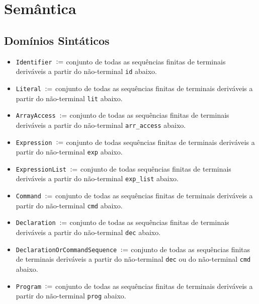 \documentclass[12pt]{article}
\newcommand{\defeq}{\vcentcolon=}
\begin{document}
\section{Semântica}

\subsection{Domínios Sintáticos}

\begin{itemize}
\item {\tt Identifier $\defeq$} conjunto de todas as sequências finitas de terminais deriváveis a partir do não-terminal {\tt id} abaixo.

\item {\tt Literal $\defeq$} conjunto de todas as sequências finitas de terminais deriváveis a partir do não-terminal {\tt lit} abaixo.

\item {\tt ArrayAccess $\defeq$} conjunto de todas as sequências finitas de terminais deriváveis a partir do não-terminal {\tt arr\_access} abaixo.

\item {\tt Expression $\defeq$} conjunto de todas sequências finitas de terminais deriváveis a partir do não-terminal {\tt exp} abaixo.

\item {\tt ExpressionList $\defeq$} conjunto de todas sequências finitas de terminais deriváveis a partir do não-terminal {\tt exp\_list} abaixo.

\item {\tt Command $\defeq$} conjunto de todas as sequências finitas de terminais deriváveis a partir do não-terminal {\tt cmd} abaixo.

\item {\tt Declaration $\defeq$} conjunto de todas as sequências finitas de terminais deriváveis a partir do não-terminal {\tt dec} abaixo.

\item {\tt DeclarationOrCommandSequence $\defeq$} conjunto de todas as sequências finitas de terminais deriváveis a partir do não-terminal {\tt dec} ou do não-terminal {\tt cmd} abaixo.

\item {\tt Program $\defeq$} conjunto de todas as sequências finitas de terminais deriváveis a partir do não-terminal {\tt prog} abaixo.

\end{itemize}
\end{document}
